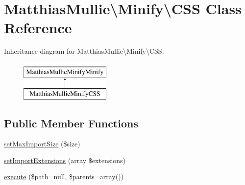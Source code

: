 \hypertarget{classMatthiasMullie_1_1Minify_1_1CSS}{}\section{Matthias\+Mullie\textbackslash{}Minify\textbackslash{}C\+SS Class Reference}
\label{classMatthiasMullie_1_1Minify_1_1CSS}
Inheritance diagram for Matthias\+Mullie\textbackslash{}Minify\textbackslash{}C\+SS\+:\begin{figure}[H]
\begin{center}
\leavevmode
\includegraphics[height=2.000000cm]{classMatthiasMullie_1_1Minify_1_1CSS}
\end{center}
\end{figure}
\subsection*{Public Member Functions}
\begin{DoxyCompactItemize}
\item 
\hyperlink{classMatthiasMullie_1_1Minify_1_1CSS_a6df933605ec05a3436a6235d8687c4e1}{set\+Max\+Import\+Size} (\$size)
\item 
\hyperlink{classMatthiasMullie_1_1Minify_1_1CSS_a893bd2d96dc1b3ead44700377997c749}{set\+Import\+Extensions} (array \$extensions)
\item 
\hyperlink{classMatthiasMullie_1_1Minify_1_1CSS_a5d2a68fad2a4a92cba7a72198e8e1b8f}{execute} (\$path=null, \$parents=array())
\end{DoxyCompactItemize}
